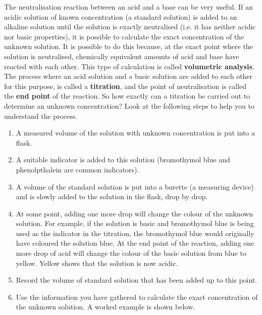 The neutralisation reaction between an acid and a base can be very useful. If an acidic solution of known concentration (a standard solution) is added to an alkaline solution until the solution is exactly neutralised (i.e. it has neither acidic nor basic properties), it is possible to calculate the exact concentration of the unknown solution. It is possible to do this because, at the exact point where the solution is neutralised, chemically equivalent amounts of acid and base have reacted with each other. This type of calculation is called \textbf{volumetric analysis}. The process where an acid solution and a basic solution are added to each other for this purpose, is called a \textbf{titration}, and the point of neutralisation is called the \textbf{end point} of the reaction. So how exactly can a titration be carried out to determine an unknown concentration? Look at the following steps to help you to understand the process.
\begin{enumerate}[label=\textbf{Step \arabic*}:]
\item A measured volume of the solution with unknown concentration is put into a flask.
\item A suitable indicator is added to this solution (bromothymol blue and phenolpthalein are common indicators).
\item A volume of the standard solution is put into a burette (a measuring device) and is slowly added to the solution in the flask, drop by drop.
\item At some point, adding one more drop will change the colour of the unknown solution. For example, if the solution is basic and bromothymol blue is being used as the indicator in the titration, the bromothymol blue would originally have coloured the solution blue. At the end point of the reaction, adding one more drop of acid will change the colour of the basic solution from blue to yellow. Yellow shows that the solution is now acidic.
\item Record the volume of standard solution that has been added up to this point.
\item Use the information you have gathered to calculate the exact concentration of the unknown solution. A worked example is shown below.
\end{enumerate}

